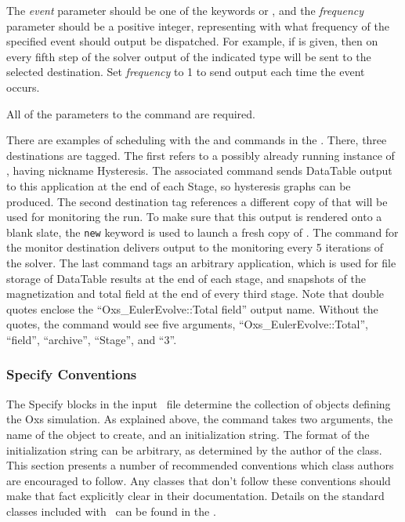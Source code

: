 \begin{description}
The \textit{event} parameter should be one of the keywords  or
, and the \textit{frequency} parameter should be a positive integer,
representing with what frequency of the specified event should output be
dispatched.  For example, if  is given, then on every fifth
step of the solver output of the indicated type will be sent to the
selected destination.  Set \textit{frequency} to 1 to send output each
time the event occurs.

All of the parameters to the  command are required.

There are examples of scheduling with the  and
 commands in the .  There,
three destinations are tagged.  The first refers to a possibly already
running instance of , having nickname Hysteresis.  The
associated  command sends DataTable output to this
application at the end of each Stage, so hysteresis graphs can be
produced.  The second destination tag references a different copy of
 that will be used for monitoring the run.  To make sure
that this output is rendered onto a blank slate, the \texttt{new}
keyword is used to launch a fresh copy of .  The
 command for the monitor destination delivers output to
the monitoring  every 5 iterations of the solver.  The last
 command tags an arbitrary  application,
which is used for file storage of DataTable results at the end of each
stage, and snapshots of the magnetization and total field at the end of
every third stage.  Note that double quotes enclose the
``Oxs\_EulerEvolve::Total field'' output name.  Without the quotes, the
 command would see five arguments,
``Oxs\_EulerEvolve::Total'', ``field'', ``archive'', ``Stage'', and
``3''.
\end{description}

\subsubsection{Specify Conventions}%
\label{sec:specConventions}
The Specify blocks in the input \MIF\ file determine the collection
of  objects defining the Oxs simulation.  As explained
above, the  command takes two
arguments, the name of the  object to create, and an
initialization string.  The format of the initialization string can
be arbitrary, as determined by the author of the  class.
This section presents a number of recommended conventions which
 class authors are encouraged to follow.  Any 
classes that don't follow these conventions should make that fact
explicitly clear in their documentation.
Details on the standard  classes included with \OOMMF\ can
be found in the
.

